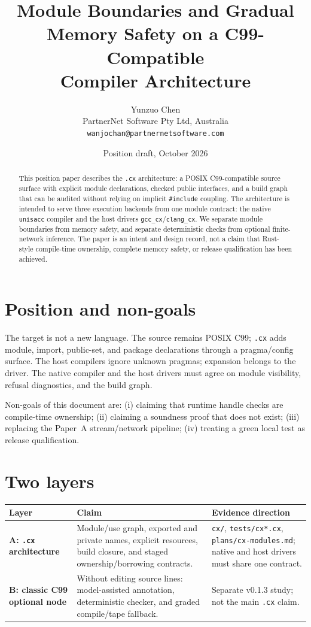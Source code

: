 \documentclass[11pt]{article}
\title{Module Boundaries and Gradual Memory Safety on a C99-Compatible\\
Compiler Architecture}
\author{Yunzuo Chen\\
PartnerNet Software Pty Ltd, Australia\\
\texttt{wanjochan@partnernetsoftware.com}}
\date{Position draft, October 2026}
\begin{document}
\maketitle

\begin{abstract}
This position paper describes the \texttt{.cx} architecture: a POSIX C99-compatible
source surface with explicit module declarations, checked public interfaces, and a
build graph that can be audited without relying on implicit \texttt{\#include}
coupling. The architecture is intended to serve three execution backends from one
module contract: the native \texttt{unisacc} compiler and the host drivers
\texttt{gcc\_cx}/\texttt{clang\_cx}. We separate module boundaries from memory
safety, and separate deterministic checks from optional finite-network inference.
The paper is an intent and design record, not a claim that Rust-style compile-time
ownership, complete memory safety, or release qualification has been achieved.
\end{abstract}

\section{Position and non-goals}

The target is not a new language. The source remains POSIX C99; \texttt{.cx} adds
module, import, public-set, and package declarations through a pragma/config
surface. The host compilers ignore unknown pragmas; expansion belongs to the
driver. The native compiler and the host drivers must agree on module visibility,
refusal diagnostics, and the build graph.

Non-goals of this document are: (i) claiming that runtime handle checks are
compile-time ownership; (ii) claiming a soundness proof that does not exist;
(iii) replacing the Paper~A stream/network pipeline; (iv) treating a green local
test as release qualification.

\section{Two layers}

\begin{longtable}{@{}p{}p{}p{}@{}}
\toprule
Layer & Claim & Evidence direction \\
\midrule
\textbf{A: \texttt{.cx} architecture} &
Module/use graph, exported and private names, explicit resources, build closure,
and staged ownership/borrowing contracts. &
\texttt{cx/}, \texttt{tests/cx*.cx}, \texttt{plans/cx-modules.md}; native and host
drivers must share one contract. \\
\textbf{B: classic C99 optional node} &
Without editing source lines: model-assisted annotation, deterministic checker,
and graded compile/tape fallback. &
Separate v0.1.3 study; not the main \texttt{.cx} claim. \\
\bottomrule
\end{longtable}
\end{document}
